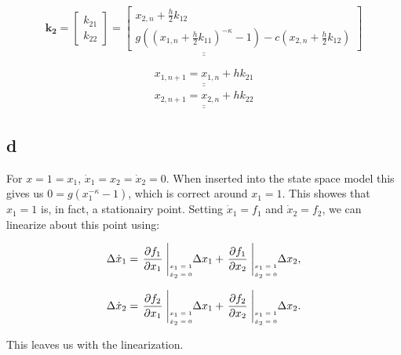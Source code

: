 \documentclass{article}
\begin{document}
\begin{equation*}
    \underline{\underline{\mathbf{k_2} = \begin{bmatrix}
    k_{21}\\
    k_{22}
    \end{bmatrix} = \begin{bmatrix}
        x_{2,n} + \frac{h}{2}k_{12}\\
        g((x_{1,n} + \frac{h}{2}k_{11})^{-\kappa} - 1) - c(x_{2,n} + \frac{h}{2}k_{12})
    \end{bmatrix}}}
\end{equation*}

\begin{align*}
    \underline{\underline{x_{1, n+1} = x_{1,n} + h k_{21}}}\\
    \underline{\underline{x_{2, n+1} = x_{2,n} + hk_{22}}}
\end{align*}

\subsection{d}

For $x = 1 = x_1 $, $\dot x_1 = x_2 = \dot x_2 = 0$. When inserted into the state space model this gives us $0 = g(x_1^{-\kappa} - 1)$, which is correct around $x_1 = 1$. This showes that $x_1 = 1$ is, in fact, a stationairy point. 
Setting $\dot x_1 = f_1$ and $\dot x_2 = f_2$, we can linearize about this point using:

\begin{equation*}
\Delta\dot x_1 = \left. \frac{\partial f_1}{\partial x_1} \right.\Bigg|_{\shortstack{\tiny $x_1 = 1$ \\ \tiny $\dot x_2 = 0$}} \Delta  x_1  + \left. \frac{\partial f_1}{\partial x_2} \right.\Bigg|_{\shortstack{\tiny $x_1 = 1$ \\ \tiny $\dot x_2 = 0$}} \Delta  x_2,
\end{equation*}

\begin{equation*}
\Delta\dot x_2 = \left. \frac{\partial f_2}{\partial x_1} \right.\Bigg|_{\shortstack{\tiny $x_1 = 1$ \\ \tiny $\dot x_2 = 0$}} \Delta  x_1  + \left. \frac{\partial f_2}{\partial x_2} \right.\Bigg|_{\shortstack{\tiny $x_1 = 1$ \\ \tiny $\dot x_2 = 0$}} \Delta  x_2.
\end{equation*}

This leaves us with the linearization.
\end{document}
